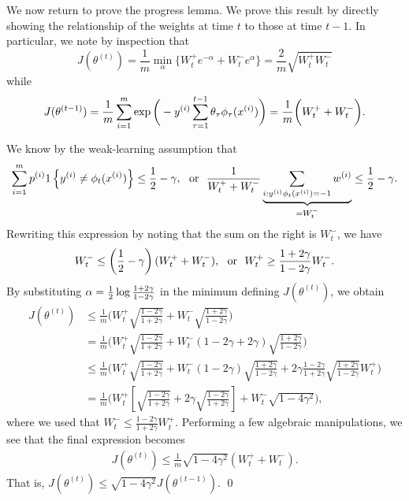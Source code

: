 \documentclass{article}
\newcommand{\represent}{\phi}
\begin{document}
We now return to prove the progress lemma. We prove this result by directly
showing the relationship of the weights at time $t$ to those at time
$t-1$. In particular, we note by inspection that
\begin{equation*}
  J(\theta^{(t)})
  = \frac{1}{m} \min_{\alpha} \{ W_t^+ e^{-\alpha} + W_t^- e^\alpha\}
  = \frac{2}{m} \sqrt{ W_t^+ W_t^-}
\end{equation*}
while
\begin{equation*}
  J(\theta^{(t - 1)})
  = \frac{1}{m} \sum_{i = 1}^m \exp\bigg(-\ysi \sum_{\tau = 1}^{t-1}
  \theta_\tau \represent_\tau(\xsi)\bigg)
  = \frac{1}{m} \bigg(W_t^+ + W_t^-\bigg).
\end{equation*}

We know by the weak-learning assumption that
\begin{equation*}
  \sum_{i = 1}^m p^{(i)} \indic{y^{(i)} \neq \represent_t(\xsi)} \le
  \half - \gamma,
  ~~ \mbox{or} ~~
  \frac{1}{W_t^+ + W_t^-}
  \underbrace{\sum_{i : \ysi \represent_t(\xsi) = -1}
    w^{(i)}}_{= W_t^-} \le \half - \gamma.
\end{equation*}
Rewriting this expression by noting that the sum on the right is $W_t^-$, we have
\begin{equation*}
  W_t^- \le \left(\frac{1}{2} - \gamma\right) (W_t^+ + W_t^-),
  ~~ \mbox{or} ~~
  W_t^+ \ge \frac{1 + 2 \gamma}{1 - 2 \gamma} W_t^-.
\end{equation*}
By substituting $\alpha = \frac{1}{2} \log \frac{1 + 2 \gamma}{1 - 2 \gamma}$
in the minimum defining $J(\theta^{(t)})$, we obtain
\begin{align*}
  J(\theta^{(t)})
  & \le \frac{1}{m}\bigg( W_t^+ \sqrt{\frac{1 - 2\gamma}{1 + 2 \gamma}}
  + W_t^- \sqrt{\frac{1 + 2 \gamma}{1 - 2 \gamma}} \bigg) \\
  & = \frac{1}{m}\bigg( W_t^+ \sqrt{\frac{1 - 2\gamma}{1 + 2 \gamma}}
  + W_t^- (1 - 2 \gamma + 2 \gamma) \sqrt{\frac{1 + 2 \gamma}{1 - 2 \gamma}}
  \bigg) \\
  & \le \frac{1}{m}\bigg( W_t^+ \sqrt{\frac{1 - 2\gamma}{1 + 2 \gamma}}
  + W_t^- (1 - 2 \gamma) \sqrt{\frac{1 + 2 \gamma}{1 - 2 \gamma}}
  + 2 \gamma \frac{1 - 2\gamma}{1 + 2\gamma}
  \sqrt{\frac{1 + 2 \gamma}{1 - 2 \gamma}}
  W_t^+ \bigg) \\
  & = \frac{1}{m}\bigg( W_t^+ \left[\sqrt{\frac{1 - 2\gamma}{1 + 2\gamma}}
    + 2\gamma \sqrt{\frac{1 - 2\gamma}{1 + 2\gamma}}
    \right]
  + W_t^- \sqrt{1 - 4 \gamma^2} \bigg),
\end{align*}
where we used that $W_t^- \le \frac{1 - 2\gamma}{1 + 2\gamma} W_t^+$.
Performing a few algebraic manipulations, we see that the final
expression becomes
\begin{align*}
  J(\theta^{(t)}) \le \frac{1}{m} \sqrt{1 - 4\gamma^2}(W_t^+ + W_t^-).
\end{align*}
That is, $J(\theta^{(t)}) \le \sqrt{1 - 4 \gamma^2} J(\theta^{(t-1)})$.
\qed
\end{document}
